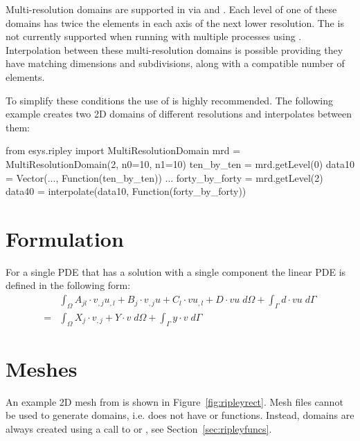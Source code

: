  
Multi-resolution domains are supported in \ripley via 
and . Each level of one of
these domains has twice the elements in each axis of the next lower resolution.
The  is not currently supported when running \escript with
multiple processes using \MPI. Interpolation between these multi-resolution
domains is possible providing they have matching dimensions and subdivisions,
along with a compatible number of elements. 

To simplify these conditions the
use of  is highly recommended. The following
example creates two 2D domains of different resolutions and interpolates
between them:

\begin{python}
 from esys.ripley import MultiResolutionDomain
 mrd = MultiResolutionDomain(2, n0=10, n1=10)
 ten_by_ten = mrd.getLevel(0)
 data10 = Vector(..., Function(ten_by_ten))
 ...
 forty_by_forty = mrd.getLevel(2)
 data40 = interpolate(data10, Function(forty_by_forty))
\end{python}

\section{Formulation}
For a single PDE that has a solution with a single component the linear PDE is
defined in the following form:
\begin{equation}\label{eq:ripleysingle}
\begin{array}{cl} &
\displaystyle{
\int_{\Omega}
A_{jl} \cdot v_{,j}u_{,l}+ B_{j} \cdot v_{,j} u+ C_{l} \cdot v u_{,l}+D \cdot vu \; d\Omega }
+ \displaystyle{\int_{\Gamma} d \cdot vu \; d{\Gamma} }\\
= & \displaystyle{\int_{\Omega}  X_{j} \cdot v_{,j}+ Y \cdot v \; d\Omega }
+ \displaystyle{\int_{\Gamma} y \cdot v \; d{\Gamma}}
\end{array}
\end{equation}

\section{Meshes}
\label{sec:ripleymeshes}
An example 2D mesh from \ripley is shown in Figure~\ref{fig:ripleyrect}.
Mesh files cannot be used to generate \ripley domains, i.e. \ripley does not
have  or  functions.
Instead, \ripley domains are always created using a call to 
or , see Section~\ref{sec:ripleyfuncs}.

